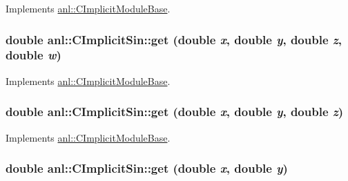 Implements \hyperlink{classanl_1_1CImplicitModuleBase_aa40b7d54572197612a4fea44b63447eb}{anl::CImplicitModuleBase}.\hypertarget{classanl_1_1CImplicitSin_a5f666f8ad48fa7337524c304b63c8a1f}{
\subsubsection[{get}]{\setlength{\rightskip}{0pt plus 5cm}double anl::CImplicitSin::get (double {\em x}, \/  double {\em y}, \/  double {\em z}, \/  double {\em w})}}
\label{classanl_1_1CImplicitSin_a5f666f8ad48fa7337524c304b63c8a1f}


Implements \hyperlink{classanl_1_1CImplicitModuleBase_a3cf520bdab59631864253c03b4e1723f}{anl::CImplicitModuleBase}.\hypertarget{classanl_1_1CImplicitSin_a5b61d1f4f70eab619edf3b7085cc0759}{
\subsubsection[{get}]{\setlength{\rightskip}{0pt plus 5cm}double anl::CImplicitSin::get (double {\em x}, \/  double {\em y}, \/  double {\em z})}}
\label{classanl_1_1CImplicitSin_a5b61d1f4f70eab619edf3b7085cc0759}


Implements \hyperlink{classanl_1_1CImplicitModuleBase_ac17d592612c82ba3d47f9229a00b1fe3}{anl::CImplicitModuleBase}.\hypertarget{classanl_1_1CImplicitSin_a16e93edeebd6771c4a42c4c11939af19}{
\subsubsection[{get}]{\setlength{\rightskip}{0pt plus 5cm}double anl::CImplicitSin::get (double {\em x}, \/  double {\em y})}}
\label{classanl_1_1CImplicitSin_a16e93edeebd6771c4a42c4c11939af19}


